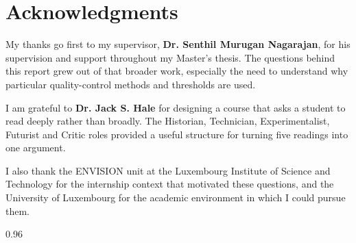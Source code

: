 \documentclass[12pt,a4paper]{article}
\begin{document}
\clearpage
\thispagestyle{empty}
\section*{Acknowledgments}

My thanks go first to my supervisor, \textbf{Dr. Senthil Murugan Nagarajan},
for his supervision and support throughout my Master's thesis. The questions
behind this report grew out of that broader work, especially the need to
understand why particular quality-control methods and thresholds are used.

I am grateful to \textbf{Dr. Jack S. Hale} for designing a course that asks
a student to read deeply rather than broadly. The Historian, Technician,
Experimentalist, Futurist and Critic roles provided a useful structure for
turning five readings into one argument.

I also thank the ENVISION unit at the Luxembourg Institute of Science and
Technology for the internship context that motivated these questions, and
the University of Luxembourg for the academic environment in which I could
pursue them.

\vspace{0.5cm}
\begin{spacing}{0.96}
\tableofcontents
\end{spacing}

\clearpage
{}










\end{document}
